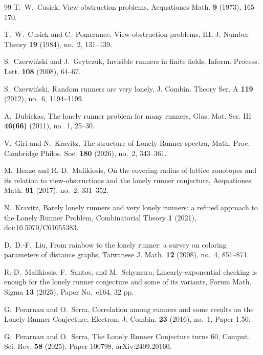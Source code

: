 \documentclass[11pt,reqno]{amsart}
\numberwithin{equation}{section}
\theoremstyle{definition}
\theoremstyle{remark}
\begin{document}
\begin{thebibliography}{99}
T.~W.~Cusick,
\newblock View-obstruction problems,
\newblock Aequationes Math. \textbf{9} (1973), 165--170.

T.~W.~Cusick and C.~Pomerance,
\newblock View-obstruction problems, III,
\newblock J. Number Theory \textbf{19} (1984), no.~2, 131--139.

S.~Czerwi\'nski and J.~Grytczuk,
\newblock Invisible runners in finite fields,
\newblock Inform. Process. Lett. \textbf{108} (2008), 64--67.

S.~Czerwi\'nski,
\newblock Random runners are very lonely,
\newblock J. Combin. Theory Ser. A \textbf{119} (2012), no.~6, 1194--1199.

A.~Dubickas,
\newblock The lonely runner problem for many runners,
\newblock Glas. Mat. Ser. III \textbf{46(66)} (2011), no.~1, 25--30.

V.~Giri and N.~Kravitz,
\newblock The structure of Lonely Runner spectra,
\newblock Math. Proc. Cambridge Philos. Soc. \textbf{180} (2026), no.~2, 343--361.

M.~Henze and R.-D.~Malikiosis,
\newblock On the covering radius of lattice zonotopes and its relation to view-obstructions and the lonely runner conjecture,
\newblock Aequationes Math. \textbf{91} (2017), no.~2, 331--352.

N.~Kravitz,
\newblock Barely lonely runners and very lonely runners: a refined approach to the Lonely Runner Problem,
\newblock Combinatorial Theory \textbf{1} (2021),
\newblock doi:10.5070/C61055383.

D.~D.-F.~Liu,
\newblock From rainbow to the lonely runner: a survey on coloring parameters of distance graphs,
\newblock Taiwanese J. Math. \textbf{12} (2008), no.~4, 851--871.

R.-D.~Malikiosis, F.~Santos, and M.~Schymura,
\newblock Linearly-exponential checking is enough for the lonely runner conjecture and some of its variants,
\newblock Forum Math. Sigma \textbf{13} (2025), Paper No.~e164, 32 pp.

G.~Perarnau and O.~Serra,
\newblock Correlation among runners and some results on the Lonely Runner Conjecture,
\newblock Electron. J. Combin. \textbf{23} (2016), no.~1, Paper 1.50.

G.~Perarnau and O.~Serra,
\newblock The Lonely Runner Conjecture turns 60,
\newblock Comput. Sci. Rev. \textbf{58} (2025), Paper 100798,
\newblock arXiv:2409.20160.


\end{thebibliography}
\end{document}
